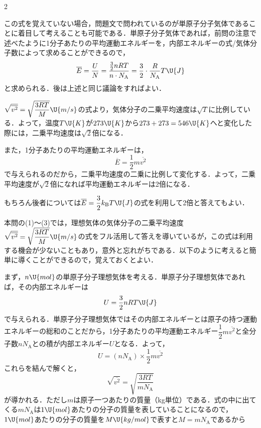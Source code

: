 \begin{multicols}{2}
\begin{bekkai}
\hspace*{1zw}この式を覚えていない場合，問題文で問われているのが単原子分子気体であることに着目して考えることも可能である．単原子分子気体であれば，前問の注意で述べたように1分子あたりの平均運動エネルギーを，内部エネルギーの式/気体分子数によって求めることができるので，
\[\overline{E}=\frac{U}{N}=\frac{\frac{3}{2}nRT}{n\cdot N_{\mathrm{A}}}=\frac{3}{2}\cdot\frac{R}{N_{\mathrm{A}}}T\U{J}\]
と求められる．後は上述と同じ議論をすればよい．
\end{bekkai}
\begin{komon}
 $\sqrt{\overline{v^2}}=\sqrt{\dfrac{3RT}{M}}\U{m/s}$の式より，気体分子の二乗平均速度は$\sqrt{T}$に比例している．よって，温度$T\U{K}$が$273\U{K}$から$273+273=546\U{K}$へと変化した際には，二乗平均速度は$\sqrt{2}$倍になる．\Ans\par
       \hspace*{1zw}また，1分子あたりの平均運動エネルギーは，
       \[\overline{E}=\frac{1}{2}m\overline{v^2}\]
       で与えられるのだから，二乗平均速度の二乗に比例して変化する．よって，二乗平均速度が$\sqrt{2}$倍になれば平均運動エネルギーは2倍になる．\Ans
\end{komon}
\begin{bekkai}
もちろん後者については$\overline{E}=\dfrac{3}{2}k_{\mathrm{B}}T\U{J}$の式を利用して2倍と答えてもよい．
\end{bekkai}
\begin{breakbox}\par\nopagebreak
本問の(1)〜(3)では，理想気体の気体分子の二乗平均速度$\sqrt{\overline{v^2}}=\sqrt{\dfrac{3RT}{M}}\U{m/s}$の式をフル活用して答えを導いているが，この式は利用する機会が少ないこともあり，意外と忘れがちである．以下のように考えると簡単に導くことができるので，覚えておくとよい．\par
\hspace*{1zw}まず，$n\U{mol}$の単原子分子理想気体を考える．単原子分子理想気体であれば，その内部エネルギーは
\[U=\frac{3}{2}nRT\U{J}\]
で与えられる．単原子分子理想気体ではその内部エネルギーとは原子の持つ運動エネルギーの総和のことだから，1分子あたりの平均運動エネルギー$\dfrac{1}{2}m\overline{v^2}$と全分子数$nN_{\mathrm{A}}$との積が内部エネルギー$U$となる．よって，
\[U=(nN_{\mathrm{A}})\times\frac{1}{2}m\overline{v^2}\]
\hspace*{1zw}これらを結んで解くと，
\[\sqrt{\overline{v^2}}=\sqrt{\frac{3RT}{mN_{\mathrm{A}}}}\]
が導かれる．ただし$m$は原子一つあたりの質量（{\gtfamily kg}単位）である．式の中に出てくる$mN_{\mathrm{A}}$は$1\U{mol}$あたりの分子の質量を表していることになるので，$1\U{mol}$あたりの分子の質量を$M\U{kg/mol}$で表すと$M=mN_{\mathrm{A}}$であるから

\end{breakbox}
\end{multicols}
